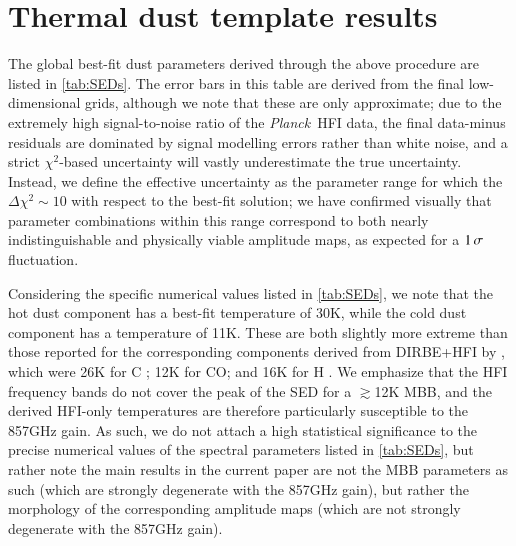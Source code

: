 \documentclass{aa}
\makeatletter
\DeclareRobustCommand{\ion}[2]{%
\relax\ifmmode
\ifx\testbx\f@series
{\mathbf{#1\,\mathsc{#2}}}\else
{\mathrm{#1\,\mathsc{#2}}}\fi
\else\textup{#1\,{\mdseries\textsc{#2}}}%
\fi}
\newcommand{\mathsc}[1]{{\normalfont\textsc{#1}}}
\def\Planck{\textit{Planck}}
\def\,{\thinspace}
\makeatother
\begin{document}
\section{Thermal dust template results}
\label{sec:results}


The global best-fit dust parameters derived through the above procedure are listed in \cref{tab:SEDs}.
The error bars in this table are derived from the final low-dimensional grids, although we note that these are only approximate; due to the extremely high signal-to-noise ratio of the \Planck\ HFI data, the final data-minus residuals are dominated by signal modelling errors rather than white noise, and a strict $\chi^2$-based uncertainty will vastly underestimate the true uncertainty. Instead, we define the effective uncertainty as the parameter range for which the $\Delta\chi^2 \sim 10$ with respect to the best-fit solution; we have confirmed visually that parameter combinations within this range correspond to both nearly indistinguishable and physically viable amplitude maps, as expected for a $1\,\sigma$ fluctuation.

Considering the specific numerical values listed in \cref{tab:SEDs}, we note that the hot dust component has a best-fit temperature of 30\,K, while the cold dust component has a temperature of 11\,K. These are both slightly more extreme than those reported for the corresponding components derived from DIRBE+HFI by \citet{CG02_05}, which were 26\,K for \ion{C}{ii}; 12\,K for CO; and 16\,K for \ion{H}{i}. We emphasize that the HFI frequency bands do not cover the peak of the SED for a $\gtrsim$12\,K MBB, and the derived HFI-only temperatures are therefore particularly susceptible to the 857\,GHz gain. As such, we do not attach a high statistical significance to the precise numerical values of the spectral parameters listed in \cref{tab:SEDs}, but rather note the main results in the current paper are not the MBB parameters as such (which are strongly degenerate with the 857\,GHz gain), but rather the morphology of the corresponding amplitude maps (which are not strongly degenerate with the 857\,GHz gain).
\end{document}
